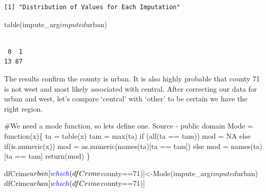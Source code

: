 \documentclass[]{article}
\newenvironment{Shaded}{}{}
\newcommand{\CommentTok}[1]{\textcolor[rgb]{0.00,0.50,0.00}{#1}}
\newcommand{\ControlFlowTok}[1]{\textcolor[rgb]{0.00,0.00,1.00}{#1}}
\newcommand{\DecValTok}[1]{#1}
\newcommand{\KeywordTok}[1]{\textcolor[rgb]{0.00,0.00,1.00}{#1}}
\newcommand{\NormalTok}[1]{#1}
\newcommand{\OperatorTok}[1]{#1}
\newcommand{\OtherTok}[1]{\textcolor[rgb]{1.00,0.25,0.00}{#1}}
\newcommand{\StringTok}[1]{\textcolor[rgb]{0.00,0.50,0.50}{#1}}
\begin{document}
\begin{verbatim}
[1] "Distribution of Values for Each Imputation"
\end{verbatim}

\begin{Shaded}
\begin{Highlighting}[]
\KeywordTok{table}\NormalTok{(impute_arg}\OperatorTok{$}\NormalTok{imputed}\OperatorTok{$}\NormalTok{urban)}
\end{Highlighting}
\end{Shaded}

\begin{verbatim}

 0  1 
13 87 
\end{verbatim}

The results confirm the county is urban. It is also highly probable that
county 71 is not west and most likely associated with central. After
correcting our data for urban and west, let's compare `central' with
`other' to be certain we have the right region.

\begin{Shaded}
\begin{Highlighting}[]
\CommentTok{#We need a mode function, so lets define one. Source - public domain}
\NormalTok{Mode =}\StringTok{ }\ControlFlowTok{function}\NormalTok{(x)\{ }
\NormalTok{    ta =}\StringTok{ }\KeywordTok{table}\NormalTok{(x)}
\NormalTok{    tam =}\StringTok{ }\KeywordTok{max}\NormalTok{(ta)}
    \ControlFlowTok{if}\NormalTok{ (}\KeywordTok{all}\NormalTok{(ta }\OperatorTok{==}\StringTok{ }\NormalTok{tam))}
\NormalTok{         mod =}\StringTok{ }\OtherTok{NA}
    \ControlFlowTok{else}
         \ControlFlowTok{if}\NormalTok{(}\KeywordTok{is.numeric}\NormalTok{(x))}
\NormalTok{    mod =}\StringTok{ }\KeywordTok{as.numeric}\NormalTok{(}\KeywordTok{names}\NormalTok{(ta)[ta }\OperatorTok{==}\StringTok{ }\NormalTok{tam])}
    \ControlFlowTok{else}
\NormalTok{         mod =}\StringTok{ }\KeywordTok{names}\NormalTok{(ta)[ta }\OperatorTok{==}\StringTok{ }\NormalTok{tam]}
    \KeywordTok{return}\NormalTok{(mod)}
\NormalTok{\}}

\NormalTok{dfCrime}\OperatorTok{$}\NormalTok{urban[}\KeywordTok{which}\NormalTok{(dfCrime}\OperatorTok{$}\NormalTok{county}\OperatorTok{==}\DecValTok{71}\NormalTok{)]<-}\KeywordTok{Mode}\NormalTok{(impute_arg}\OperatorTok{$}\NormalTok{imputed}\OperatorTok{$}\NormalTok{urban)}
\NormalTok{dfCrime}\OperatorTok{$}\NormalTok{urban[}\KeywordTok{which}\NormalTok{(dfCrime}\OperatorTok{$}\NormalTok{county}\OperatorTok{==}\DecValTok{71}\NormalTok{)]}
\end{Highlighting}
\end{Shaded}
\end{document}
